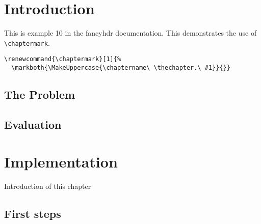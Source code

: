 \documentclass{book}
\renewcommand{\chaptermark}[1]{%
  \markboth{\MakeUppercase{\chaptername\ \thechapter.\ #1}}{}}
\begin{document}
\chapter{Introduction}

\begin{boxedminipage}{\textwidth}
This is example 10 in the fancyhdr documentation. 
This demonstrates the use of \verb|\chaptermark|.
\begin{verbatim}
\renewcommand{\chaptermark}[1]{%
  \markboth{\MakeUppercase{\chaptername\ \thechapter.\ #1}}{}}
\end{verbatim}
\end{boxedminipage}

\section{The Problem}
\label{sec:problem}

\lipsum[1]

\section{Evaluation}

\lipsum[2]

\chapter{Implementation}

Introduction of this chapter

\lipsum[3]

\section{First steps}
\label{sec:first-steps}

\lipsum
\end{document}
